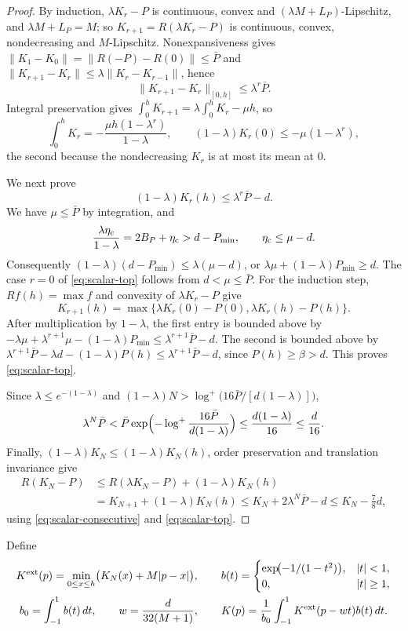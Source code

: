 \begin{proof}
By induction, $\lambda K_r-P$ is continuous, convex and $(\lambda M+L_P)$-Lipschitz, and $\lambda M+L_P=M$; so
$K_{r+1}=R(\lambda K_r-P)$ is continuous, convex, nondecreasing and $M$-Lipschitz. Nonexpansiveness gives
$\|K_1-K_0\|=\|R(-P)-R(0)\|\le\bar P$ and $\|K_{r+1}-K_r\|\le\lambda\|K_r-K_{r-1}\|$, hence
\begin{equation}\label{eq:scalar-consecutive}
 \|K_{r+1}-K_r\|_{[0,h]}\le\lambda^r\bar P.
\end{equation}
Integral preservation gives $\int_0^hK_{r+1}=\lambda\int_0^hK_r-\mu h$, so
\[
 \int_0^hK_r=-\frac{\mu h(1-\lambda^r)}{1-\lambda},\qquad
 (1-\lambda)K_r(0)\le-\mu(1-\lambda^r),
\]
the second because the nondecreasing $K_r$ is at most its mean at $0$.

We next prove
\begin{equation}\label{eq:scalar-top}
 (1-\lambda)K_r(h)\le\lambda^r\bar P-d.
\end{equation}
We have $\mu\le\bar P$ by integration, and
\[
 \frac{\lambda\eta_{\rm c}}{1-\lambda}=2B_P+\eta_{\rm c}>d-P_{\min},\qquad
 \eta_{\rm c}\le\mu-d.
\]
Consequently
$(1-\lambda)(d-P_{\min})\le\lambda(\mu-d)$, or
$\lambda\mu+(1-\lambda)P_{\min}\ge d$.
The case $r=0$ of \eqref{eq:scalar-top} follows from $d<\mu\le\bar P$.
For the induction step, $Rf(h)=\max f$ and convexity of $\lambda K_r-P$ give
\[
 K_{r+1}(h)=\max\{\lambda K_r(0)-P(0),\lambda K_r(h)-P(h)\}.
\]
After multiplication by $1-\lambda$, the first entry is bounded above by
$-\lambda\mu+\lambda^{r+1}\mu-(1-\lambda)P_{\min}\le\lambda^{r+1}\bar P-d$.
The second is bounded above by
$\lambda^{r+1}\bar P-\lambda d-(1-\lambda)P(h)\le\lambda^{r+1}\bar P-d$, since $P(h)\ge\beta>d$.
This proves \eqref{eq:scalar-top}.

Since $\lambda\le e^{-(1-\lambda)}$ and $(1-\lambda)N>\log^+\bigl(16\bar P/[d(1-\lambda)]\bigr)$,
\[
 \lambda^N\bar P<\bar P\exp\Bigl(-\log^+\frac{16\bar P}{d(1-\lambda)}\Bigr)\le\frac{d(1-\lambda)}{16}\le\frac d{16}.
\]
Finally, $(1-\lambda)K_N\le(1-\lambda)K_N(h)$, order preservation and translation invariance give
\begin{align*}
 R(K_N-P)&\le R(\lambda K_N-P)+(1-\lambda)K_N(h)\\
 &=K_{N+1}+(1-\lambda)K_N(h)
 \le K_N+2\lambda^N\bar P-d\le K_N-\frac78d,
\end{align*}
using \eqref{eq:scalar-consecutive} and \eqref{eq:scalar-top}.
\end{proof}

Define
\begin{gather}\label{eq:scalar-mollifier}
 K^{\rm ext}(p)=\min_{0\le x\le h}\bigl(K_N(x)+M|p-x|\bigr),\qquad
 b(t)=\begin{cases}\exp\!\bigl(-1/(1-t^2)\bigr),&|t|<1,\\0,&|t|\ge1,\end{cases}\\
 b_0=\int_{-1}^1b(t)\,dt,\qquad w=\frac{d}{32(M+1)},\qquad
 K(p)=\frac1{b_0}\int_{-1}^1K^{\rm ext}(p-wt)b(t)\,dt.\notag
\end{gather}


